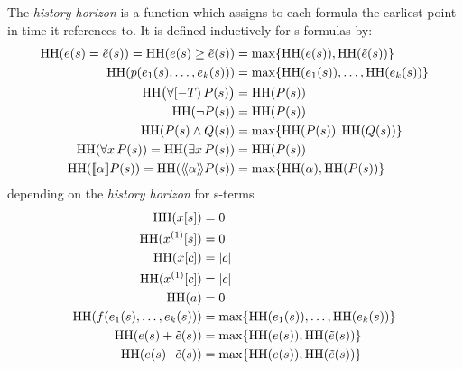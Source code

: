         \begin{definition}
            The \emph{history horizon} is a function
            which
            assigns to each \ddL formula the earliest point in time it references to.
            It is defined inductively for s-formulas by:
            \begin{align*}
                \HH{\astrm(s)=\bstrm(s)} = \HH{\astrm(s)\geq\bstrm(s)} &= \max\set{\HH{\astrm(s)},\HH{\bstrm(s)}}\\
                \HH{p(\range{\istrm{1}(s)}{\istrm{k}(s)})} &= \max\set{\range{\HH{\istrm{1}(s)}}{\HH{\istrm{k}(s)}}}\\
                \HH[\big]{\hs{\asfml(s)}} &= \HH{\asfml(s)}\\
                \HH{\lnot\asfml(s)} &= \HH{\asfml(s)}\\
                \HH{\asfml(s)\land\bsfml(s)} &= \max\set{\HH{\asfml(s)},\HH{\bsfml(s)}}\\
                \HH{\lforall{x}{\asfml(s)}} = \HH{\lexists{x}{\asfml(s)}} &= \HH{\asfml(s)}\\
                \HH{\dbox{\asprg}{\asfml(s)}} = \HH{\ddiamond{\asprg}{\asfml(s)}} &= \max\set{\HH{\asprg},\HH{\asfml(s)}}\\
            \end{align*}
            depending on the \emph{history horizon} for s-terms
            \begin{align*}
                \HH{\x[s]} &= 0\\
                \HH{\Dx[s]} &= 0\\
                \HH{\x[c]} &= \abs{c}\\
                \HH{\Dx[c]} &= \abs{c}\\
                \HH{a} &= 0\\
                \HH{f(\range{\istrm{1}(s)}{\istrm{k}(s)})} &= \max\set{\range{\HH{\istrm{1}(s)}}{\HH{\istrm{k}(s)}}}\\
                \HH{\astrm(s)+\bstrm(s)} &= \max\set{\HH{\astrm(s)},\HH{\bstrm(s)}}\\
                \HH{\astrm(s)\cdot\bstrm(s)} &= \max\set{\HH{\astrm(s)},\HH{\bstrm(s)}}

\end{align*}
\end{definition}
